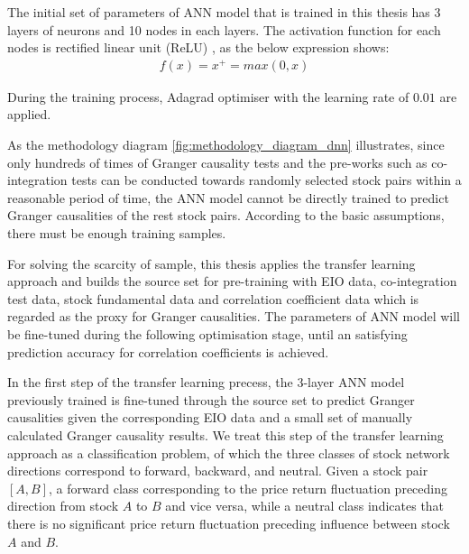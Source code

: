 The initial set of parameters of ANN model that is trained in this thesis has 3 layers of neurons and 10 nodes in each layers. The activation function for each nodes is rectified linear unit (ReLU) \cite{hahnloser2000digital}, as the below expression shows:
\begin{eqnarray}
f\left(x\right)=x^+=max\left(0,x\right)
\end{eqnarray}

During the training process, Adagrad optimiser \cite{duchi2011adaptive} with the learning rate of $0.01$ are applied.

As the methodology diagram \ref{fig:methodology_diagram_dnn} illustrates, since only hundreds of times of Granger causality tests and the pre-works such as co-integration tests can be conducted towards randomly selected stock pairs within a reasonable period of time, the ANN model cannot be directly trained to predict Granger causalities of the rest stock pairs. According to the basic assumptions, there must be enough training samples.

For solving the scarcity of sample, this thesis applies the transfer learning approach and builds the source set for pre-training with EIO data, co-integration test data, stock fundamental data and correlation coefficient data which is regarded as the proxy for Granger causalities. The parameters of ANN model will be fine-tuned during the following optimisation stage, until an satisfying prediction accuracy for correlation coefficients is achieved.

In the first step of the transfer learning precess, the 3-layer ANN model previously trained is fine-tuned through the source set to predict Granger causalities given the corresponding EIO data and a small set of manually calculated Granger causality results. We treat this step of the transfer learning approach as a classification problem, of which the three classes of stock network directions correspond to forward, backward, and neutral. Given a stock pair $[A,B]$, a forward class corresponding to the price return fluctuation preceding direction from stock $A$ to $B$ and vice versa, while a neutral class indicates that there is no significant price return fluctuation preceding influence between stock $A$ and $B$.


